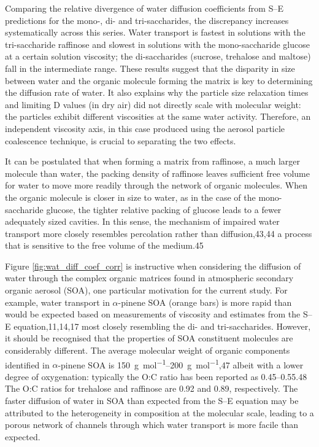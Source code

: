 Comparing the relative divergence of water diffusion coefficients from S–E predictions for the mono-, di- and tri-saccharides, the discrepancy increases systematically across this series. Water transport is fastest in solutions with the tri-saccharide raffinose and slowest in solutions with the mono-saccharide glucose at a certain solution viscosity; the di-saccharides (sucrose, trehalose and maltose) fall in the intermediate range. These results suggest that the disparity in size between water and the organic molecule forming the matrix is key to determining the diffusion rate of water. It also explains why the particle size relaxation times and limiting D values (in dry air) did not directly scale with molecular weight: the particles exhibit different viscosities at the same water activity. Therefore, an independent viscosity axis, in this case produced using the aerosol particle coalescence technique, is crucial to separating the two effects.

It can be postulated that when forming a matrix from raffinose, a much larger molecule than water, the packing density of raffinose leaves sufficient free volume for water to move more readily through the network of organic molecules. When the organic molecule is closer in size to water, as in the case of the mono-saccharide glucose, the tighter relative packing of glucose leads to a fewer adequately sized cavities. In this sense, the mechanism of impaired water transport more closely resembles percolation rather than diffusion,43,44 a process that is sensitive to the free volume of the medium.45

Figure \ref{fig:wat_diff_coef_corr} is instructive when considering the diffusion of water through the complex organic matrices found in atmospheric secondary organic aerosol (SOA), one particular motivation for the current study. For example, water transport in $\alpha$-pinene SOA (orange bars) is more rapid than would be expected based on measurements of viscosity and estimates from the S–E equation,11,14,17 most closely resembling the di- and tri-saccharides. However, it should be recognised that the properties of SOA constituent molecules are considerably different. The average molecular weight of organic components identified in $\alpha$-pinene SOA is \SIrange{150}{200}{\gram\per\mole},47 albeit with a lower degree of oxygenation: typically the O:C ratio has been reported as \numrange{0.45}{0.55}.48 The O:C ratios for trehalose and raffinose are \num{0.92} and \num{0.89}, respectively. The faster diffusion of water in SOA than expected from the S–E equation may be attributed to the heterogeneity in composition at the molecular scale, leading to a porous network of channels through which water transport is more facile than expected.

